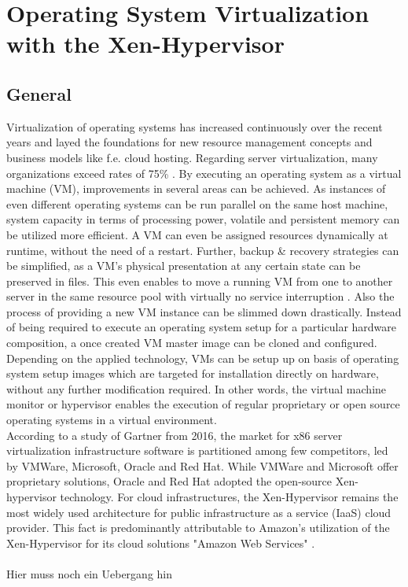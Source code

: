 \chapter{Operating System Virtualization with the Xen-Hypervisor}
\label{cha:2}

\section{General}

Virtualization of operating systems has increased continuously over the recent years and layed the foundations for new resource management concepts and business models like f.e. cloud hosting. Regarding server virtualization, many organizations exceed rates of 75\% \cite{gartnervmmarket}. By executing an operating system as a virtual machine (VM), improvements in several areas can be achieved. As instances of even different operating systems can be run parallel on the same host machine, system capacity in terms of processing power, volatile and persistent memory can be utilized more efficient. A VM can even be assigned resources dynamically at runtime, without the need of a restart. Further, backup \& recovery strategies can be simplified, as a VM's physical presentation at any certain state can be preserved in files. This even enables to move a running VM from one to another server in the same resource pool with virtually no service interruption \cite{migratevms}. Also the process of providing a new VM instance can be slimmed down drastically. Instead of being required to execute an operating system setup for a particular hardware composition, a once created VM master image can be cloned and configured. Depending on the applied technology, VMs can be setup up on basis of operating system setup images which are targeted for installation directly on hardware, without any further modification required. In other words, the virtual machine monitor or hypervisor enables the execution of regular proprietary or open source operating systems in a virtual environment. \\
According to a study of Gartner from 2016, the market for x86 server virtualization infrastructure software is partitioned among few competitors, led by VMWare, Microsoft, Oracle and Red Hat. While VMWare and Microsoft offer proprietary solutions, Oracle and Red Hat adopted the open-source Xen-hypervisor technology. For cloud infrastructures, the Xen-Hypervisor remains the most widely used architecture for public infrastructure as a service (IaaS) cloud provider. This fact is predominantly attributable to Amazon's utilization of the Xen-Hypervisor for its cloud solutions "Amazon Web Services" \cite{bittman2016magic}.
\\~\\
Hier muss noch ein Uebergang hin
\\


